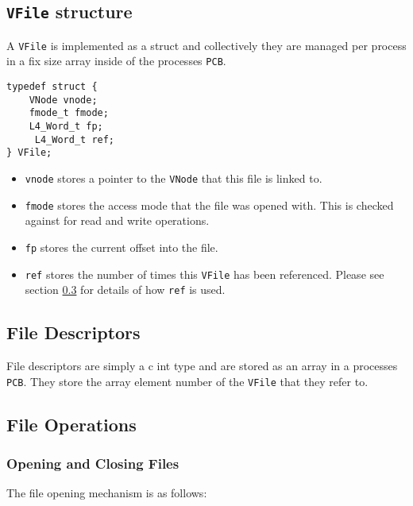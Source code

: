 \documentclass[12pt,english]{article}
\begin{document}
\subsection{\texttt{VFile} structure} \label{vfs:vfile_struct}

A \texttt{VFile} is implemented as a struct and collectively they are managed per process in a fix size array inside of the processes \texttt{PCB}.

\begin{verbatim}
typedef struct {
    VNode vnode;
    fmode_t fmode;
    L4_Word_t fp;
	 L4_Word_t ref;
} VFile;
\end{verbatim}

\begin{itemize}
\item \texttt{vnode} stores a pointer to the \texttt{VNode} that this file is linked to.
\item \texttt{fmode} stores the access mode that the file was opened with. This is checked against for read and write operations.
\item \texttt{fp} stores the current offset into the file.
\item \texttt{ref} stores the number of times this \texttt{VFile} has been referenced. Please see section \ref{vfs:file_ops} for details of how \texttt{ref} is used.
\end{itemize}

\subsection{File Descriptors} \label{vfs:fds}

File descriptors are simply a c int type and are stored as an array in a processes \texttt{PCB}. They store the array element number of the \texttt{VFile} that they refer to.

\subsection{File Operations} \label{vfs:file_ops}

\subsubsection{Opening and Closing Files} \label{vfs:file_ops:openclose}

The file opening mechanism is as follows:
\end{document}
